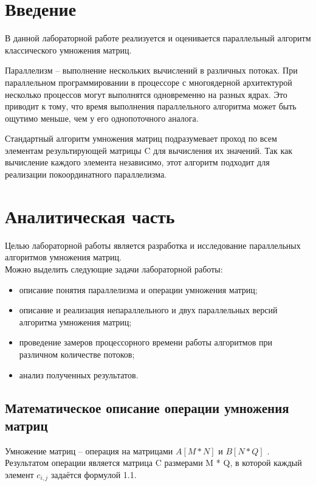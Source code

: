 \documentclass[12pt,a4paper]{report}
\begin{document}

\tableofcontents

\newpage
\chapter*{Введение}

В данной лабораторной работе реализуется и оценивается параллельный алгоритм классического умножения матриц.

Параллелизм -- выполнение нескольких вычислений в различных потоках. 
При параллельном программировании в процессоре с многоядерной архитектурой несколько процессов могут выполнятся 
одновременно на разных ядрах.
Это приводит к тому, что время выполнения параллельного алгоритма может быть ощутимо меньше, чем у его 
однопоточного аналога.

Стандартный алгоритм умножения матриц подразумевает проход по всем элементам результирующей матрицы C для 
вычисления их значений. Так как вычисление каждого элемента независимо, этот алгоритм подходит для реализации 
покоординатного параллелизма.

\newpage
\chapter{Аналитическая часть}

Целью лабораторной работы является разработка и исследование параллельных алгоритмов умножения матриц. \\

Можно выделить следующие задачи лабораторной работы:
\begin{itemize}
    \item описание понятия параллелизма и операции умножения матриц;
    \item описание и реализация непараллельного и двух параллельных версий алгоритма умножения матриц;
    \item проведение замеров процессорного времени работы алгоритмов при различном количестве потоков;
    \item анализ полученных результатов.
\end{itemize}

\section{Математическое описание операции умножения матриц}

Умножение матриц -- операция на матрицами $A[M * N]$ и $B[N * Q]$ \cite{belous_off}. 
Результатом операции является матрица C размерами M * Q, в которой каждый элемент $c_{i,j}$ задаётся 
формулой 1.1.
\end{document}
